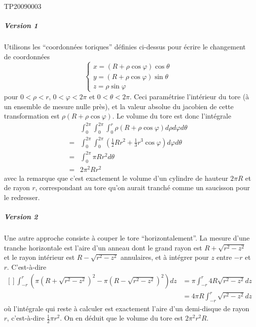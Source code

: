 \begin{corrige}{TP20090003}
\subparagraph{Version 1}
Utilisons les ``coordonnées toriques'' définies ci-dessus pour écrire
le changement de coordonnées
\begin{equation*}
  \begin{cases}
    x = (R + \rho\cos \varphi) \cos \theta\\
    y = (R + \rho\cos \varphi) \sin \theta\\
    z = \rho \sin \varphi%
  \end{cases}
\end{equation*}
pour $0 < \rho < r$, $0 < \varphi < 2\pi$ et $0 < \theta < 2\pi$. Ceci
paramétrise l'intérieur du tore (à un ensemble de mesure nulle près),
et la valeur absolue du jacobien de cette transformation est $\rho (R
+ \rho \cos \varphi)$. Le volume du tore est donc l'intégrale
\begin{equation*}
  \begin{split}
    &\int_0^{2\pi} \int_0^{2\pi} \int_0^r \rho (R + \rho \cos \varphi) d\rho d\varphi  d\theta\\
    = &\int_0^{2\pi} \int_0^{2\pi} \left(\frac12 R r^2 +
      \frac 13 r^3 \cos \varphi\right)  d\varphi  d\theta\\
    = &\int_0^{2\pi}  \pi R r^2  d\theta\\
    = &2 \pi^2 R r^2
  \end{split}
\end{equation*}
avec la remarque que c'est exactement le volume d'un cylindre de
hauteur $2\pi R$ et de rayon $r$, correspondant au tore qu'on aurait
tranché comme un saucisson pour le redresser.


\subparagraph{Version 2}
Une autre approche consiste à couper le tore ``horizontalement''. La
mesure d'une tranche horizontale est l'aire d'un anneau dont le grand
rayon est $R + \sqrt{r^2 - z^2}$ et le rayon intérieur est $R - \sqrt{r^2 - z^2}$
annulaires, et à intégrer pour $z$ entre $-r$ et $r$. C'est-à-dire
\begin{equation}
	\begin{aligned}[]
  		\int_{-r}^r \left(\pi (R+\sqrt{r^2-z^2})^2 - \pi (R-\sqrt{r^2-z^2})^2\right)  d z 	&= \pi \int_{-r}^r 4 R \sqrt{r^2 - z^2}  d z\\
													&= 4 \pi R \int_{-r}^r \sqrt{r^2-z^2}  d z
	\end{aligned}
\end{equation}
où l'intégrale qui reste à calculer est exactement l'aire d'un demi-disque de rayon $r$, c'est-à-dire $\frac{ 1 }{2} \pi r^2$. On en déduit que le
volume du tore est $2 \pi^2 r^2 R$.



\end{corrige}
